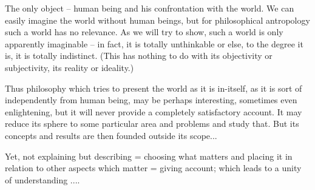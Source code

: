 {The only object -- human being and his confrontation with the
world. We can easily imagine the world without human beings, but
for philosophical antropology such a world has no relevance.
As we will try to show, such a world is only apparently imaginable
-- in fact, it is totally unthinkable or else, to the degree it is,
it is totally indistinct.
(This has nothing to do with its objectivity or subjectivity, its
reality or ideality.)

Thus philosophy which tries to present the world as it is in-itself,
as it is sort of independently from human being, may be perhaps
interesting, sometimes even enlightening, but it will never provide 
a completely satisfactory account. It may reduce its sphere to some
particular area and problems and study that. But its concepts and
results are then founded outside its scope...


Yet, not explaining but describing = choosing what matters and
placing it in relation to other aspects which matter = giving account;
which leads to a unity of understanding ....

}
